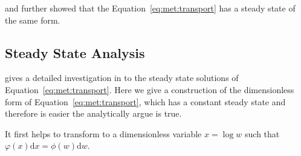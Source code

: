 and further \cite{datta2010} showed that the Equation~\ref{eq:met:transport} has a steady state of the same form.

\subsection{Steady State Analysis}
\cite{datta2011} gives a detailed investigation in to the steady state solutions of Equation~\ref{eq:met:transport}. Here we give a construction of the dimensionless form of Equation~\ref{eq:met:transport}, which has a constant steady state and therefore is easier the analytically argue is true.

It first helps to transform to a dimensionless variable $x = \log{w}$ such that $\varphi(x) \mathrm{d}x = \phi(w) \mathrm{d}w$.
